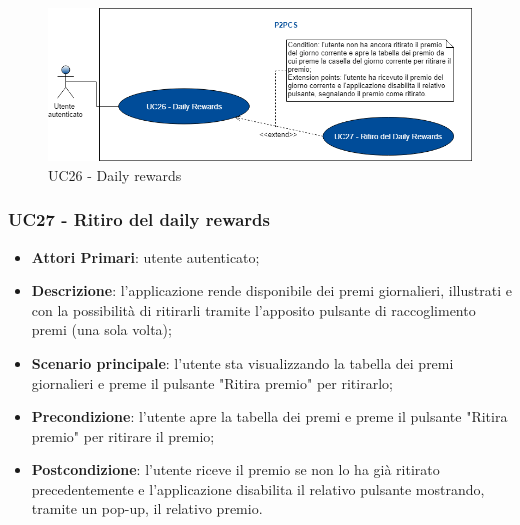 \begin{figure}[h]
	\includegraphics[width=13.2cm]{res/images/UC24Daily.png}
	\centering
	\caption{UC26 - Daily rewards}
\end{figure}
\subsubsection{UC27 - Ritiro del daily rewards}
\begin{itemize}
	\item \textbf{Attori Primari}: utente autenticato;
	\item \textbf{Descrizione}: l'applicazione rende disponibile dei premi giornalieri, illustrati e con la possibilità di ritirarli tramite l'apposito pulsante di raccoglimento premi (una sola volta);
	\item \textbf{Scenario principale}: l'utente sta visualizzando la tabella dei premi giornalieri e preme il pulsante "Ritira premio" per ritirarlo;
	\item \textbf{Precondizione}: l'utente apre la tabella dei premi e preme il pulsante "Ritira premio" per ritirare il premio;
	\item \textbf{Postcondizione}: l'utente riceve il premio se non lo ha già ritirato precedentemente e l'applicazione disabilita il relativo pulsante mostrando, tramite un pop-up, il relativo premio.  
\end{itemize} 